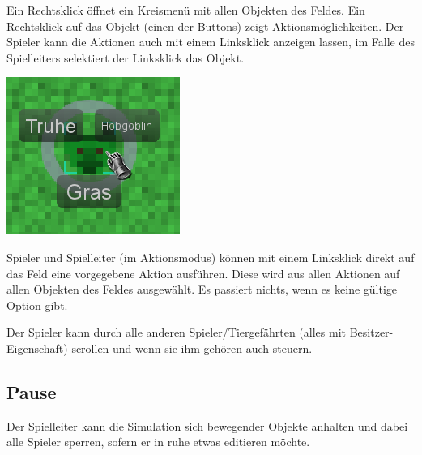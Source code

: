 \documentclass[german,10pt,a4paper,twocolumn,colorscheme=darkblue]{orarticle}
\begin{document}
			\begin{minipage}{0.54\linewidth}
			Ein Rechtsklick öffnet ein Kreismenü mit allen Objekten des Feldes. Ein Rechtsklick auf das Objekt (einen der Buttons) zeigt Aktionsmöglichkeiten. Der Spieler kann die Aktionen auch mit einem Linksklick anzeigen lassen, im Falle des Spielleiters selektiert der Linksklick das Objekt.
			\end{minipage}\hspace{1em}
			\begin{minipage}{0.4\linewidth}
				\includegraphics[width=1.0\linewidth]{img/circularmenu}
			\end{minipage}
			
			Spieler und Spielleiter (im Aktionsmodus) können mit einem Linksklick direkt auf das Feld eine vorgegebene Aktion ausführen. Diese wird aus allen Aktionen auf allen Objekten des Feldes ausgewählt. Es passiert nichts, wenn es keine gültige Option gibt.
		
			Der Spieler kann durch alle anderen Spieler/Tiergefährten (alles mit Besitzer-Eigenschaft) scrollen und wenn sie ihm gehören auch steuern.
			
		\subsection{Pause}
			Der Spielleiter kann die Simulation sich bewegender Objekte anhalten und dabei alle Spieler sperren, sofern er in ruhe etwas editieren möchte.
		
\end{document}

